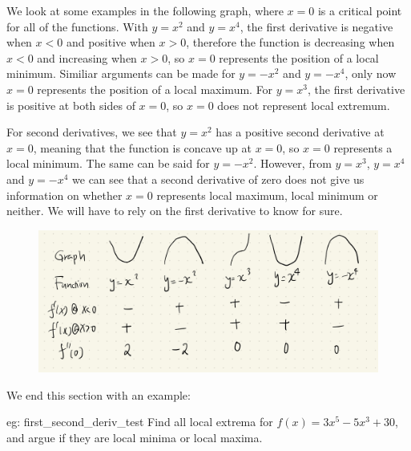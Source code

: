 We look at some examples in the following graph, where $x=0$ is a critical point for all of the functions.  With $y=x^2$ and $y=x^4$, the first derivative is negative when $x<0$ and positive when $x>0$, therefore the function is decreasing when $x < 0$ and increasing when $x > 0$, so $x=0$ represents the position of a local minimum.  Similiar arguments can be  made for $y=-x^2$ and $y=-x^4$, only now $x=0$ represents the position of a local maximum.  For $y = x^3$, the first derivative is positive at both sides of $x=0$, so $x=0$ does not represent local extremum.  

For second derivatives, we see that $y=x^2$ has a positive second derivative at $x=0$, meaning that the function is concave up at $x=0$, so $x=0$ represents a local minimum.  The same can be said for $y=-x^2$.  However, from $y=x^3$, $y=x^4$ and $y=-x^4$ we can see that a second derivative of zero does not give us information on whether $x=0$ represents local maximum, local minimum or neither.  We will have to rely on the first derivative to know for sure.


\begin{figure}[ht]
    \centering
    \includegraphics[width = \textwidth]{figures/chap 05/first_second_deriv_test.png}
    \label{fig: first_second_deriv_test}
\end{figure}

We end this section with an example:

\begin{eg}[]{eg: first_second_deriv_test}
    Find all local extrema for $f(x) = 3x^5 - 5x^3 + 30$, and argue if they are local minima or local maxima.
\end{eg}

